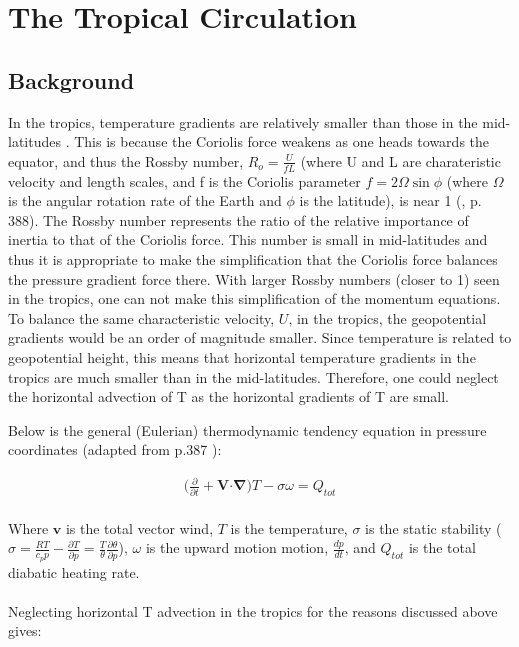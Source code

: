 \documentclass[letterpaper,12pt,titlepage,oneside,final]{book}
\begin{document}
\section{The Tropical Circulation}
\subsection{Background}
In the tropics, temperature gradients are relatively smaller than those in the mid-latitudes \citep{sobel_weak_2001}. This is because the Coriolis force weakens as one heads towards the equator, and thus the Rossby number, $R_{o}=\frac{U}{fL}$ (where U and L are charateristic velocity and length scales, and f is the Coriolis parameter $f=2\Omega\sin{\phi}$ (where $\Omega$ is the angular rotation rate of the Earth and $\phi$ is the latitude), is near 1 (\citep{holton_introduction_2004}, p. 388). The Rossby number represents the ratio of the relative importance of inertia to that of the Coriolis force. This number is small in mid-latitudes and thus it is appropriate to make the simplification that the Coriolis force balances the pressure gradient force there. With larger Rossby numbers (closer to 1) seen in the tropics, one can not make this simplification of the momentum equations. To balance the same characteristic velocity, $U$, in the tropics, the geopotential gradients would be an order of magnitude smaller. Since temperature is related to geopotential height, this means that horizontal temperature gradients in the tropics are much smaller than in the mid-latitudes. Therefore, one could neglect the horizontal advection of T as the horizontal gradients of T are small. 

Below is the general (Eulerian) thermodynamic tendency equation in pressure coordinates (adapted from p.387 \citep{holton_introduction_2004}):

\begin{align}
\Big(\frac{\partial}{\partial{t}}+\mathbf{V}\boldsymbol{\cdot} \mathbf{\nabla}\Big)T - \sigma\omega =Q_{tot}
\end{align}
\\
Where $\mathbf{v}$ is the total vector wind, $T$ is the temperature, $\sigma$ is the static stability ($\sigma=\frac{RT}{c_{p}p} - \frac{\partial{T}}{\partial{p}} = \frac{T}{\theta}\frac{\partial{\theta}}{\partial{p}}$), $\omega$ is the upward motion motion, $\frac{dp}{dt}$, and $Q_{tot}$ is the total diabatic heating rate. 
\\
\\
Neglecting horizontal T advection in the tropics for the reasons discussed above gives:
\end{document}
